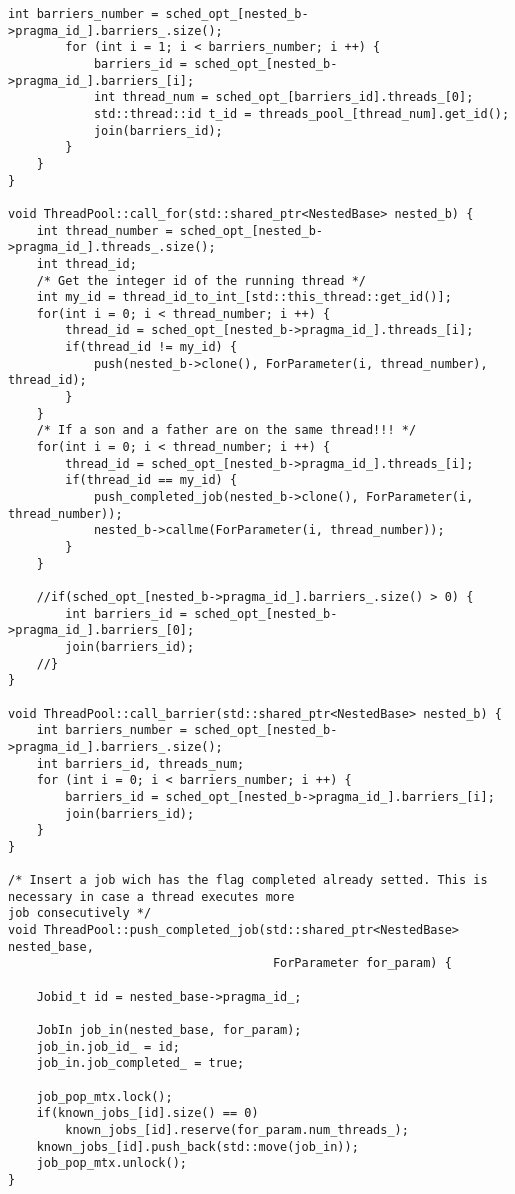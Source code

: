 \documentclass[a4paper,10pt,twoside]{book}
\begin{document}
\begin{lstlisting}[language=CCC, caption=thread\_pool.cpp]
        int barriers_number = sched_opt_[nested_b->pragma_id_].barriers_.size();
        for (int i = 1; i < barriers_number; i ++) {
            barriers_id = sched_opt_[nested_b->pragma_id_].barriers_[i];
            int thread_num = sched_opt_[barriers_id].threads_[0];
            std::thread::id t_id = threads_pool_[thread_num].get_id();
            join(barriers_id);
        }
    }
}

void ThreadPool::call_for(std::shared_ptr<NestedBase> nested_b) {
    int thread_number = sched_opt_[nested_b->pragma_id_].threads_.size();
    int thread_id;
    /* Get the integer id of the running thread */
    int my_id = thread_id_to_int_[std::this_thread::get_id()];
    for(int i = 0; i < thread_number; i ++) {
        thread_id = sched_opt_[nested_b->pragma_id_].threads_[i];
        if(thread_id != my_id) {
            push(nested_b->clone(), ForParameter(i, thread_number), thread_id);
        }
    }
    /* If a son and a father are on the same thread!!! */
    for(int i = 0; i < thread_number; i ++) {
        thread_id = sched_opt_[nested_b->pragma_id_].threads_[i];
        if(thread_id == my_id) {
            push_completed_job(nested_b->clone(), ForParameter(i, thread_number));
            nested_b->callme(ForParameter(i, thread_number));
        }
    }

    //if(sched_opt_[nested_b->pragma_id_].barriers_.size() > 0) {
        int barriers_id = sched_opt_[nested_b->pragma_id_].barriers_[0];
        join(barriers_id);
    //}
}

void ThreadPool::call_barrier(std::shared_ptr<NestedBase> nested_b) {
    int barriers_number = sched_opt_[nested_b->pragma_id_].barriers_.size();
    int barriers_id, threads_num;
    for (int i = 0; i < barriers_number; i ++) {
        barriers_id = sched_opt_[nested_b->pragma_id_].barriers_[i];
        join(barriers_id);
    }
}

/* Insert a job wich has the flag completed already setted. This is necessary in case a thread executes more
job consecutively */
void ThreadPool::push_completed_job(std::shared_ptr<NestedBase> nested_base,
                                     ForParameter for_param) {

    Jobid_t id = nested_base->pragma_id_;
        
    JobIn job_in(nested_base, for_param);
    job_in.job_id_ = id;
    job_in.job_completed_ = true;

    job_pop_mtx.lock();
    if(known_jobs_[id].size() == 0)
        known_jobs_[id].reserve(for_param.num_threads_);
    known_jobs_[id].push_back(std::move(job_in));
    job_pop_mtx.unlock();
}



\end{lstlisting}
\end{document}
